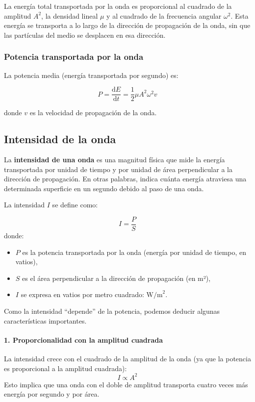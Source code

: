 La energía total transportada por la onda es proporcional al cuadrado de la amplitud \(A^2\), la densidad lineal \(\mu\) y al cuadrado de la frecuencia angular \(\omega^2\). Esta energía se transporta a lo largo de la dirección de propagación de la onda, sin que las partículas del medio se desplacen en esa dirección.

\subsubsection{Potencia transportada por la onda}

La potencia media (energía transportada por segundo) es:

\[
P = \frac{\mathrm{d}E}{\mathrm{d}t} = \frac{1}{2} \mu A^2 \omega^2 v
\]

donde \(v\) es la velocidad de propagación de la onda.


\subsection{Intensidad de la onda}

La \textbf{intensidad de una onda} es una magnitud física que mide la energía transportada por unidad de tiempo y por unidad de área perpendicular a la dirección de propagación. En otras palabras, indica cuánta energía atraviesa una determinada superficie en un segundo debido al paso de una onda.

La intensidad \(I\) se define como:

\[
I = \frac{P}{S}
\]
donde:
\begin{itemize}
  \item \(P\) es la potencia transportada por la onda (energía por unidad de tiempo, en vatios),
  \item \(S\) es el área perpendicular a la dirección de propagación (en m²),
  \item \(I\) se expresa en vatios por metro cuadrado: \(\text{W/m}^2\).
\end{itemize}

Como la intensidad ``depende'' de la potencia, podemos deducir algunas características importantes. 

\paragraph{1. Proporcionalidad con la amplitud cuadrada}

La intensidad crece con el cuadrado de la amplitud de la onda (ya que la potencia es proporcional a la amplitud cuadrada):
\[
I \propto A^2
\]
Esto implica que una onda con el doble de amplitud transporta cuatro veces más energía por segundo y por área.

